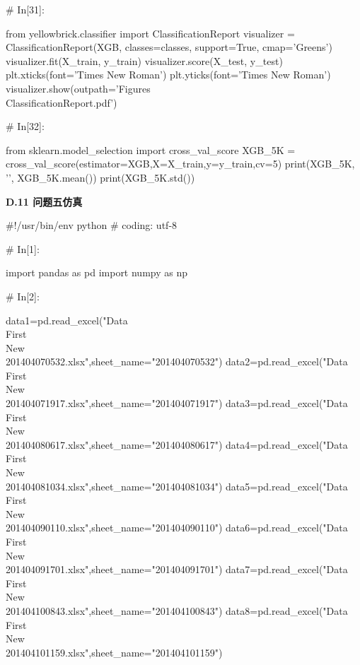 \documentclass{MathorCupModeling}
\begin{document}
\begin{python}
# In[31]:


from yellowbrick.classifier import ClassificationReport
visualizer = ClassificationReport(XGB, classes=classes, support=True, cmap='Greens')
visualizer.fit(X_train, y_train)
visualizer.score(X_test, y_test)
plt.xticks(font='Times New Roman')
plt.yticks(font='Times New Roman')
visualizer.show(outpath='Figures\\ClassificationReport.pdf')


# In[32]:


from sklearn.model_selection import cross_val_score
XGB_5K = cross_val_score(estimator=XGB,X=X_train,y=y_train,cv=5)
print(XGB_5K, '\n', XGB_5K.mean())
print(XGB_5K.std())


\end{python}
\newpage
\textbf{D.11 问题五仿真}
\begin{python}
#!/usr/bin/env python
# coding: utf-8

# In[1]:


import pandas as pd
import numpy as np


# In[2]:


data1=pd.read_excel("Data\\First\\New\\201404070532.xlsx",sheet_name="201404070532")
data2=pd.read_excel("Data\\First\\New\\201404071917.xlsx",sheet_name="201404071917")
data3=pd.read_excel("Data\\First\\New\\201404080617.xlsx",sheet_name="201404080617")
data4=pd.read_excel("Data\\First\\New\\201404081034.xlsx",sheet_name="201404081034")
data5=pd.read_excel("Data\\First\\New\\201404090110.xlsx",sheet_name="201404090110")
data6=pd.read_excel("Data\\First\\New\\201404091701.xlsx",sheet_name="201404091701")
data7=pd.read_excel("Data\\First\\New\\201404100843.xlsx",sheet_name="201404100843")
data8=pd.read_excel("Data\\First\\New\\201404101159.xlsx",sheet_name="201404101159")



\end{python}
\end{document}
